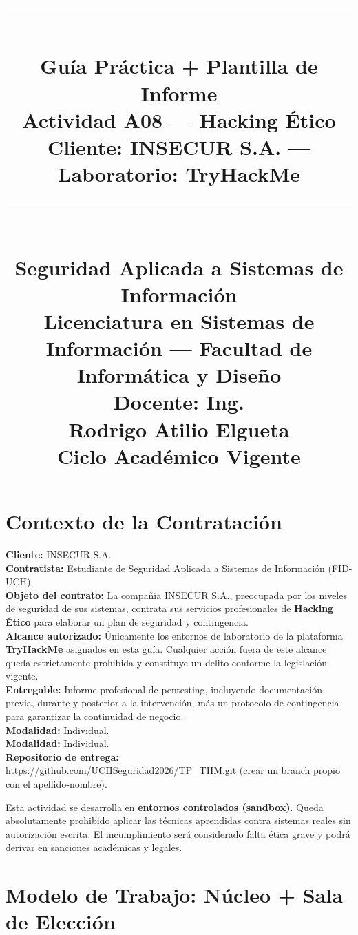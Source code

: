 \documentclass[11pt,a4paper]{article}
\title{%
  \rule{\textwidth}{1pt}\\[0.3cm]
  \textbf{\Large Guía Práctica + Plantilla de Informe}\\[0.2cm]
  \textbf{\Large Actividad A08 --- Hacking Ético}\\[0.2cm]
  \large Cliente: \textbf{INSECUR S.A.} --- Laboratorio: TryHackMe\\[0.2cm]
  \rule{\textwidth}{1pt}\\[0.3cm]
  \normalsize Seguridad Aplicada a Sistemas de Información\\
  Licenciatura en Sistemas de Información --- Facultad de Informática y Diseño\\
  Docente: Ing.\\ Rodrigo Atilio Elgueta\\[0.2cm]
  \small Ciclo Académico Vigente
}
\author{}
\date{}
\begin{document}
\maketitle
\thispagestyle{fancy}
\tableofcontents
\newpage

\section{Contexto de la Contratación}

\begin{campo}
\textbf{Cliente:} INSECUR S.A.\\
\textbf{Contratista:} Estudiante de Seguridad Aplicada a Sistemas de Información (FID-UCH).\\[0.2cm]
\textbf{Objeto del contrato:} La compañía INSECUR S.A., preocupada por los niveles de seguridad de sus sistemas, contrata sus servicios profesionales de \textbf{Hacking Ético} para elaborar un plan de seguridad y contingencia.\\[0.2cm]
\textbf{Alcance autorizado:} Únicamente los entornos de laboratorio de la plataforma \textbf{TryHackMe} asignados en esta guía. Cualquier acción fuera de este alcance queda estrictamente prohibida y constituye un delito conforme la legislación vigente.\\[0.2cm]
\textbf{Entregable:} Informe profesional de pentesting, incluyendo documentación previa, durante y posterior a la intervención, más un protocolo de contingencia para garantizar la continuidad de negocio.\\[0.2cm]
\textbf{Modalidad:} Individual.\\
\textbf{Modalidad:} Individual.\\
\textbf{Repositorio de entrega:} \url{https://github.com/UCHSeguridad2026/TP_THM.git} (crear un branch propio con el apellido-nombre).
\end{campo}

\begin{alerta}
Esta actividad se desarrolla en \textbf{entornos controlados (sandbox)}. Queda absolutamente prohibido aplicar las técnicas aprendidas contra sistemas reales sin autorización escrita. El incumplimiento será considerado falta ética grave y podrá derivar en sanciones académicas y legales.
\end{alerta}

\section{Modelo de Trabajo: Núcleo + Sala de Elección}
\end{document}
